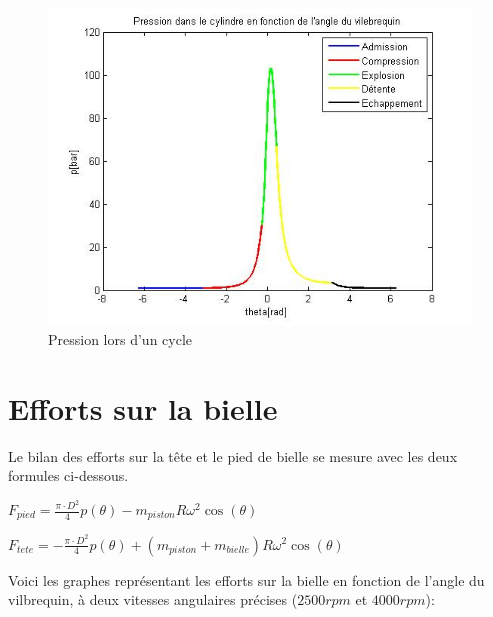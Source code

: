\documentclass[a4paper,oneside,12pt]{report}
\begin{document}
\begin{figure}[H]
	\center
	\includegraphics[scale=0.75]{pression.jpg}
	\caption{Pression lors d'un cycle}
\end{figure}

\section{Efforts sur la bielle}

Le bilan des efforts sur la tête et le pied de bielle se mesure avec les deux formules ci-dessous. 

\begin{center}
$F_{pied} = \frac{\pi \cdot D^2}{4}p(\theta) -  m_{piston}R\omega^2 \cos(\theta)  $ \\
\end{center}
\begin{center}
$F_{tete} = -\frac{\pi \cdot D^2}{4}p(\theta) +  (m_{piston}+m_{bielle})R\omega^2 \cos(\theta)$ 
\end{center}

Voici les graphes représentant les efforts sur la bielle en fonction de l'angle du vilbrequin, à deux vitesses angulaires précises ($2500rpm$ et $4000rpm$):
\end{document}
